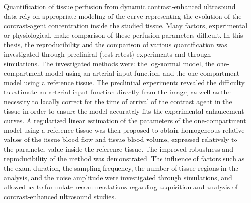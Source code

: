 %
%
%
Quantification of tissue perfusion from dynamic contrast-enhanced ultrasound data rely on appropriate modeling of the curve representing the evolution of the contrast-agent concentration inside the studied tissue.
Many factors, experimental or physiological, make comparison of these perfusion parameters difficult.
In this thesis, the reproducibility and the comparison of various quantification was investigated through preclinical (test-retest) experiments and through simulations.
The investigated methods were: the log-normal model, the one-compartment model using an arterial input function, and the one-compartment model using a reference tissue.
The preclinical experiments revealed the difficulty to estimate an arterial input function directly from the image, as well as the necessity to locally correct for the time of arrival of the contrast agent in the tissue in order to ensure the model accurately fits the experimental enhancement curves.
A regularized linear estimation of the parameters of the one-compartment model using a reference tissue was then proposed to obtain homogeneous relative values of the tissue blood flow and tissue blood volume, expressed relatively to the parameter value inside the reference tissue.
The improved robustness and reproducibility of the method was demonstrated.
The influence of factors such as the exam duration, the sampling frequency, the number of tissue regions in the analysis, and the noise amplitude were investigated through simulations, and allowed us to formulate recommendations regarding acquisition and analysis of contrast-enhanced ultrasound studies.

